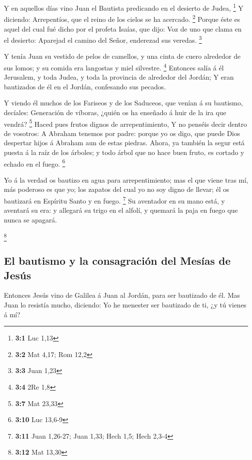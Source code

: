  Y en aquellos días vino Juan el Bautista predicando en el
desierto de Judea, \footnote{\textbf{3:1} Luc 1,13}  Y
diciendo: Arrepentíos, que el reino de los cielos se ha acercado.
\footnote{\textbf{3:2} Mat 4,17; Rom 12,2}  Porque éste es
aquel del cual fué dicho por el profeta Isaías, que dijo: Voz de uno que
clama en el desierto: Aparejad el camino del Señor, enderezad sus
veredas. \footnote{\textbf{3:3} Juan 1,23}

 Y tenía Juan su vestido de pelos de camellos, y una cinta
de cuero alrededor de sus lomos; y su comida era langostas y miel
silvestre. \footnote{\textbf{3:4} 2Re 1,8}  Entonces salía
á él Jerusalem, y toda Judea, y toda la provincia de alrededor del
Jordán;  Y eran bautizados de él en el Jordán, confesando
sus pecados.

 Y viendo él muchos de los Fariseos y de los Saduceos, que
venían á su bautismo, decíales: Generación de víboras, ¿quién os ha
enseñado á huir de la ira que vendrá? \footnote{\textbf{3:7} Mat 23,33}
 Haced pues frutos dignos de arrepentimiento,
 Y no penséis decir dentro de vosotros: A Abraham tenemos
por padre: porque yo os digo, que puede Dios despertar hijos á Abraham
aun de estas piedras.  Ahora, ya también la segur está
puesta á la raíz de los árboles; y todo árbol que no hace buen fruto, es
cortado y echado en el fuego. \footnote{\textbf{3:10} Luc 13,6-9}

 Yo á la verdad os bautizo en agua para arrepentimiento;
mas el que viene tras mí, más poderoso es que yo; los zapatos del cual
yo no soy digno de llevar; él os bautizará en Espíritu Santo y en fuego.
\footnote{\textbf{3:11} Juan 1,26-27; Juan 1,33; Hech 1,5; Hech 2,3-4}
 Su aventador en su mano está, y aventará su era: y
allegará su trigo en el alfolí, y quemará la paja en fuego que nunca se
apagará.

\footnote{\textbf{3:12} Mat 13,30}

\hypertarget{el-bautismo-y-la-consagraciuxf3n-del-mesuxedas-de-jesuxfas}{%
\subsection{El bautismo y la consagración del Mesías de
Jesús}\label{el-bautismo-y-la-consagraciuxf3n-del-mesuxedas-de-jesuxfas}}

 Entonces Jesús vino de Galilea á Juan al Jordán, para
ser bautizado de él.  Mas Juan lo resistía mucho,
diciendo: Yo he menester ser bautizado de ti, ¿y tú vienes á mí?

